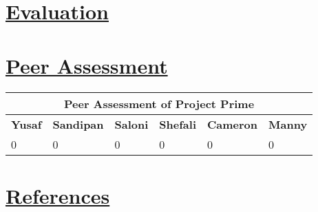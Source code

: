 \documentclass{article}
\begin{document}
\section{\underline{Evaluation}}

\section{\underline{Peer Assessment}}
\begin{tabular}{|p{2cm}|p{2cm}|p{2cm}|p{2cm}|p{2cm}|p{2cm}|}
\hline
\multicolumn{6}{|c|}{\textbf{Peer Assessment of Project Prime}} \\
\hline
\textbf{Yusaf} & \textbf{Sandipan} & \textbf{Saloni} & \textbf{Shefali} & \textbf{Cameron} & \textbf{Manny} \\
\hline
0 & 0 & 0 & 0 & 0 & 0 \\
\hline
\end{tabular}
	
\section{\underline{References}}
\end{document}
